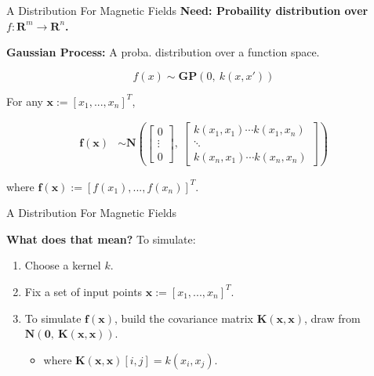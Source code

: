 \documentclass{beamer}
\begin{document}
\begin{frame}{A Distribution For Magnetic Fields}
  \textbf{Need: Probaility distribution over $f: \mathbf{R}^m \rightarrow \mathbf{R}^n$.}

  \textbf{Gaussian Process:} A proba. distribution over a function space.

  \begin{equation*}
    f(x) \sim \mathbf{GP}\left( 0,\ k(x, x')\right)
  \end{equation*}

  For any $\mathbf{x} := [x_1, ... , x_n]^T$,

  \begin{align*}
    \mathbf{f(x)} &\sim
    \mathbf{N}
    \left(
    \begin{bmatrix} 0 \\ \vdots \\ 0 \end{bmatrix}, \
    \begin{bmatrix}
      k(x_1, x_1) \cdots  k(x_1, x_n)\\
      \ddots \\
      k(x_n, x_1) \cdots  k(x_n, x_n)
    \end{bmatrix}
    \right)
  \end{align*}

  where $\mathbf{f(x)} := [f(x_1), ... , f(x_n)]^T$.

\end{frame}


\begin{frame}{A Distribution For Magnetic Fields}

  \textbf{What does that mean?} To simulate:

  \begin{enumerate}
    \setlength\itemsep{1em}
    \item Choose a kernel $k$.
    \item Fix a set of input points $\mathbf{x} := [x_1, ... , x_n]^T$.
    \item To simulate $\mathbf{f(x)}$, build the covariance matrix $\mathbf{K(x, x)}$, draw from $\mathbf{N\left(0, \ K(x, x)\right)}$.
    \vspace{1em}
    \begin{itemize}
      \item[] where $\mathbf{K(x, x)}[i, j] = k(x_i, x_j).$
    \end{itemize}
  \end{enumerate}

\end{frame}
\end{document}
